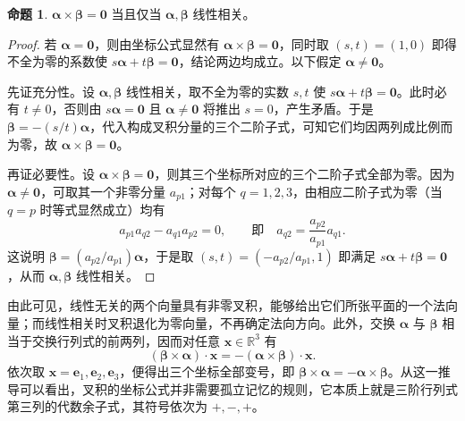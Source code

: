 \documentclass[UTF8, fontset=fandol, a4paper, 12pt]{ctexart}
\theoremstyle{definition}
\newtheorem{proposition}[theorem]{命题}
\begin{document}
\begin{proposition}
$\boldsymbol\alpha\times\boldsymbol\beta=\boldsymbol0$ 当且仅当 $\boldsymbol\alpha,\boldsymbol\beta$ 线性相关。
\end{proposition}
\begin{proof}
若 $\boldsymbol\alpha=\boldsymbol0$，则由坐标公式显然有 $\boldsymbol\alpha\times\boldsymbol\beta=\boldsymbol0$，同时取 $(s,t)=(1,0)$ 即得不全为零的系数使 $s\boldsymbol\alpha+t\boldsymbol\beta=\boldsymbol0$，结论两边均成立。以下假定 $\boldsymbol\alpha\ne\boldsymbol0$。

先证充分性。设 $\boldsymbol\alpha,\boldsymbol\beta$ 线性相关，取不全为零的实数 $s,t$ 使 $s\boldsymbol\alpha+t\boldsymbol\beta=\boldsymbol0$。此时必有 $t\ne0$，否则由 $s\boldsymbol\alpha=\boldsymbol0$ 且 $\boldsymbol\alpha\ne\boldsymbol0$ 将推出 $s=0$，产生矛盾。于是 $\boldsymbol\beta=-(s/t)\boldsymbol\alpha$，代入构成叉积分量的三个二阶子式，可知它们均因两列成比例而为零，故 $\boldsymbol\alpha\times\boldsymbol\beta=\boldsymbol0$。

再证必要性。设 $\boldsymbol\alpha\times\boldsymbol\beta=\boldsymbol0$，则其三个坐标所对应的三个二阶子式全部为零。因为 $\boldsymbol\alpha\ne\boldsymbol0$，可取其一个非零分量 $a_{p1}$；对每个 $q=1,2,3$，由相应二阶子式为零（当 $q=p$ 时等式显然成立）均有
\[
 a_{p1}a_{q2}-a_{q1}a_{p2}=0,
 \qquad \text{即}\quad a_{q2}=\frac{a_{p2}}{a_{p1}}a_{q1}.
\]
这说明 $\boldsymbol\beta=(a_{p2}/a_{p1})\boldsymbol\alpha$，于是取 $(s,t)=(-a_{p2}/a_{p1},1)$ 即满足 $s\boldsymbol\alpha+t\boldsymbol\beta=\boldsymbol0$，从而 $\boldsymbol\alpha,\boldsymbol\beta$ 线性相关。
\end{proof}

由此可见，线性无关的两个向量具有非零叉积，能够给出它们所张平面的一个法向量；而线性相关时叉积退化为零向量，不再确定法向方向。此外，交换 $\boldsymbol\alpha$ 与 $\boldsymbol\beta$ 相当于交换行列式的前两列，因而对任意 $\boldsymbol x\in\mathbb R^3$ 有
\[
 (\boldsymbol\beta\times\boldsymbol\alpha)\cdot\boldsymbol x
 =-(\boldsymbol\alpha\times\boldsymbol\beta)\cdot\boldsymbol x.
\]
依次取 $\boldsymbol x=\boldsymbol e_1,\boldsymbol e_2,\boldsymbol e_3$，便得出三个坐标全部变号，即 $\boldsymbol\beta\times\boldsymbol\alpha=-\boldsymbol\alpha\times\boldsymbol\beta$。从这一推导可以看出，叉积的坐标公式并非需要孤立记忆的规则，它本质上就是三阶行列式第三列的代数余子式，其符号依次为 $+,-,+$。
\end{document}

